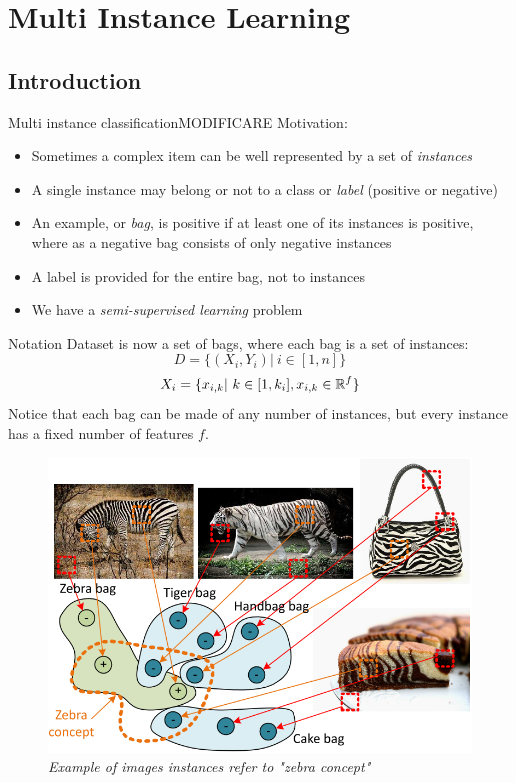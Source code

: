 \section{Multi Instance Learning}
 
\subsection*{Introduction}
\begin{frame}{Multi instance classification}MODIFICARE
	Motivation:
	\begin{itemize}\setlength\itemsep{1em}
		\item Sometimes a complex item can be well represented by a set of \textit{instances}
		\item A single instance may belong or not to a class or \textit{label} (positive or negative)
		\item An example, or \textit{bag}, is positive if at least one of its instances is positive, where as a negative bag consists of only negative instances
		\item A label is provided for the
		entire bag, not to instances
		\item We have a \textit{semi-supervised learning} problem
	\end{itemize}
	\begin{flushright}
		\cite{mi1}
	\end{flushright}
\end{frame}

\begin{frame}{Notation}
	Dataset is now a set of bags, where each bag is a set of instances:
	$$D = \{(X_i, Y_i) | \ i \in [1, n]\}$$
	$$X_i = \{x_{i,k} | \ k \in [1, k_i], x_{i,k} \in \mathbb{R}^f\}$$
	Notice that each bag can be made of any number of instances, but every instance has a fixed number of features $f$.
	\begin{figure}[htbp]
		\centering
		\includegraphics[scale = 0.15]{./images/mi3.png}
		\caption{\textit{Example of images instances refer to "zebra concept"}}
	\end{figure}
\end{frame}

